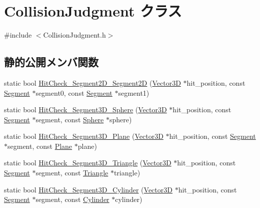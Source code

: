 \hypertarget{class_collision_judgment}{}\section{Collision\+Judgment クラス}
\label{class_collision_judgment}


{\ttfamily \#include $<$Collision\+Judgment.\+h$>$}

\subsection*{静的公開メンバ関数}
\begin{DoxyCompactItemize}
\item 
static bool \mbox{\hyperlink{class_collision_judgment_a612bc9e5cfcb243324417f5059c6e24d}{Hit\+Check\+\_\+\+Segment2\+D\+\_\+\+Segment2D}} (\mbox{\hyperlink{class_vector3_d}{Vector3D}} $\ast$hit\+\_\+position, const \mbox{\hyperlink{class_segment}{Segment}} $\ast$segment0, const \mbox{\hyperlink{class_segment}{Segment}} $\ast$segment1)
\item 
static bool \mbox{\hyperlink{class_collision_judgment_a92531c1254846a0a06ee7e95796f1070}{Hit\+Check\+\_\+\+Segment3\+D\+\_\+\+Sphere}} (\mbox{\hyperlink{class_vector3_d}{Vector3D}} $\ast$hit\+\_\+position, const \mbox{\hyperlink{class_segment}{Segment}} $\ast$segment, const \mbox{\hyperlink{class_sphere}{Sphere}} $\ast$sphere)
\item 
static bool \mbox{\hyperlink{class_collision_judgment_ac31167bc6d89d20f7220220ee3f21f4e}{Hit\+Check\+\_\+\+Segment3\+D\+\_\+\+Plane}} (\mbox{\hyperlink{class_vector3_d}{Vector3D}} $\ast$hit\+\_\+position, const \mbox{\hyperlink{class_segment}{Segment}} $\ast$segment, const \mbox{\hyperlink{class_plane}{Plane}} $\ast$plane)
\item 
static bool \mbox{\hyperlink{class_collision_judgment_a4f5344d6ac14db5d3732db47050bd549}{Hit\+Check\+\_\+\+Segment3\+D\+\_\+\+Triangle}} (\mbox{\hyperlink{class_vector3_d}{Vector3D}} $\ast$hit\+\_\+position, const \mbox{\hyperlink{class_segment}{Segment}} $\ast$segment, const \mbox{\hyperlink{class_triangle}{Triangle}} $\ast$triangle)
\item 
static bool \mbox{\hyperlink{class_collision_judgment_a61308e967a8569bcee4b25c74e28826d}{Hit\+Check\+\_\+\+Segment3\+D\+\_\+\+Cylinder}} (\mbox{\hyperlink{class_vector3_d}{Vector3D}} $\ast$hit\+\_\+position, const \mbox{\hyperlink{class_segment}{Segment}} $\ast$segment, const \mbox{\hyperlink{class_cylinder}{Cylinder}} $\ast$cylinder)

\end{DoxyCompactItemize}
